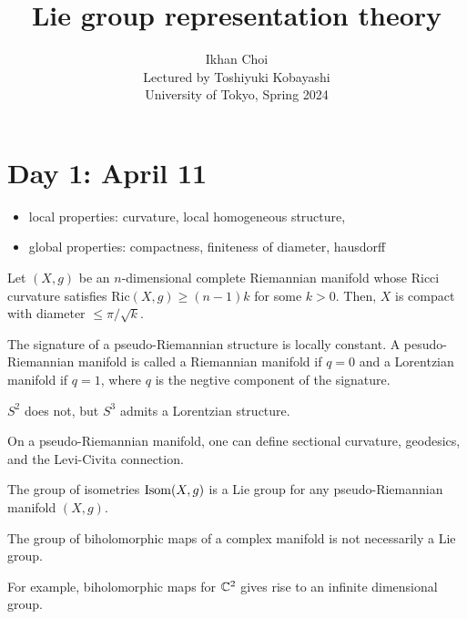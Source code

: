 \documentclass{../../../small}
\newcommand{\Ric}{\mathrm{Ric}}
\begin{document}
\title{Lie group representation theory}
\author{Ikhan Choi\\Lectured by Toshiyuki Kobayashi\\University of Tokyo, Spring 2024}
\maketitle
\tableofcontents

\newpage
\section{Day 1: April 11}

\begin{itemize}
\item local properties: curvature, local homogeneous structure,
\item global properties: compactness, finiteness of diameter, hausdorff
\end{itemize}

\begin{thm}
Let $(X,g)$ be an $n$-dimensional complete Riemannian manifold whose Ricci curvature satisfies $\Ric(X,g)\ge(n-1)k$ for some $k>0$.
Then, $X$ is compact with diameter $\le\pi/\sqrt k$.
\end{thm}

\begin{defn}
\end{defn}
\begin{ex}
The signature of a pseudo-Riemannian structure is locally constant.
A pesudo-Riemannian manifold is called a Riemannian manifold if $q=0$ and a Lorentzian manifold if $q=1$, where $q$ is the negtive component of the signature.
\end{ex}
\begin{ex}
$S^2$ does not, but $S^3$ admits a Lorentzian structure.
\end{ex}

On a pseudo-Riemannian manifold, one can define sectional curvature, geodesics, and the Levi-Civita connection.

\begin{thm}
The group of isometries $\operatorname{Isom}(X,g)$ is a Lie group for any pseudo-Riemannian manifold $(X,g)$.
\end{thm}

\begin{rmk}
The group of biholomorphic maps of a complex manifold is not necessarily a Lie group.
\end{rmk}
\begin{ex}
For example, biholomorphic maps for $\mathbb{C}^2$ gives rise to an infinite dimensional group.
\end{ex}
\end{document}
